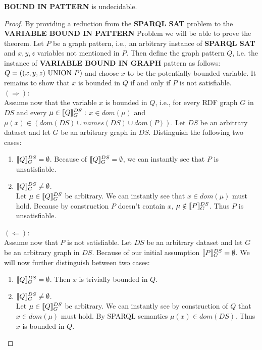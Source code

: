 \begin{theorem}\label{boundundec}
	\textbf{BOUND IN PATTERN} is undecidable.
\end{theorem}
\begin{proof}
	By providing a reduction from the \textbf{SPARQL SAT} problem to the
	\textbf{VARIABLE BOUND IN PATTERN} Problem we will be able to prove the theorem.
	Let $P$ be a graph pattern, i.e., an arbitrary instance of \textbf{SPARQL SAT} and
	$x,y,z$ variables not mentioned in $P$. Then define the graph pattern $Q$,
	i.e. the instance of \textbf{VARIABLE BOUND IN GRAPH} pattern as follows: $Q =
	((x,y,z) \mbox{ UNION }  P)$ and choose $x$ to be the potentially bounded variable.
	It remains to show that $x$ is bounded in $Q$  if and only if $P$ is not
	satisfiable.\\
	$(\Rightarrow)$:\\
	Assume now that the variable $x$ is bounded in $Q$, i.e., for every RDF graph $G$
	in $DS$ and every $\mu \in \llbracket Q \rrbracket^{DS}_G:$ $x \in dom(\mu)$ and $\mu(x) \in
	(dom(DS) \cup names(DS) \cup dom(P))$. Let $DS$ be an arbitrary dataset and let
	$G$ be an arbitrary graph in $DS$. Distinguish the following two cases:
	\begin{enumerate}
		\item $\llbracket Q \rrbracket^{DS}_G = \emptyset$. Because of $\llbracket Q \rrbracket^{DS}_G =
			\emptyset$, we can instantly see that $P$ is unsatisfiable.
		\item $\llbracket Q \rrbracket^{DS}_G \neq \emptyset$.\\
			Let $\mu \in \llbracket Q \rrbracket^{DS}_G$ be arbitrary.
			We can instantly see that $x \in dom(\mu)$ must hold. 
			Because by construction $P$ doesn't contain $x$, 
			$\mu \notin \llbracket P \rrbracket^{DS}_G$. Thus $P$ is unsatisfiable.
	\end{enumerate}
	\noindent$(\Leftarrow)$:\\
	Assume now that $P$ is not satisfiable. Let $DS$ be an arbitrary dataset and let
	$G$ be an arbitrary graph in $DS$. Because of our initial assumption $\llbracket P
	\rrbracket^{DS}_G = \emptyset$. We will now further distinguish between two cases:
	\begin{enumerate}
		\item $\llbracket Q \rrbracket^{DS}_G = \emptyset$. Then $x$ is trivially bounded in $Q$.

		\item $\llbracket Q \rrbracket^{DS}_G \neq \emptyset$.\\
			Let $\mu \in \llbracket Q \rrbracket^{DS}_G$ be arbitrary.
			We can instantly see by construction of $Q$ that $x \in
			dom(\mu)$ must hold. By SPARQL semantics $\mu(x) \in dom(DS)$. Thus $x$
			is bounded in $Q$.\qedhere
	\end{enumerate}
\end{proof} 

